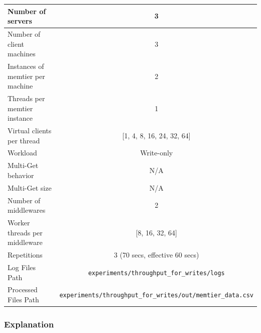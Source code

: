 \documentclass[11pt,a4paper]{article}
\begin{document}
\begin{center}
	\scriptsize{
		\begin{tabular}{|l|c|}
			\hline Number of servers                & 3          \\ 
			\hline Number of client machines        & 3          \\ 
			\hline Instances of memtier per machine & 2          \\ 
			\hline Threads per memtier instance     & 1          \\
			\hline Virtual clients per thread       & [1, 4, 8, 16, 24, 32, 64]    \\ 
			\hline Workload                         & Write-only \\
			\hline Multi-Get behavior               & N/A        \\
			\hline Multi-Get size                   & N/A        \\
			\hline Number of middlewares            & 2          \\
			\hline Worker threads per middleware    & [8, 16, 32, 64]    \\
            \hline Repetitions                      & 3 (70 secs, effective 60 secs) \\ 
            \hline Log Files Path                   & \texttt{experiments/throughput\_for\_writes/logs} \\
            \hline Processed Files Path             & \texttt{experiments/throughput\_for\_writes/out/memtier\_data.csv}\\
            \hline
		\end{tabular}
	} 
\end{center}

\subsubsection{Explanation}
\end{document}
